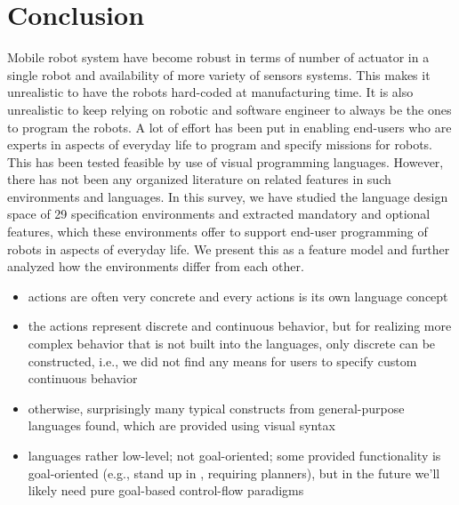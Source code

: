 \section{Conclusion}
Mobile robot system have become robust in terms of number of actuator in a single robot and  availability of more variety of sensors systems. This makes it unrealistic to have the robots hard-coded at manufacturing time. It is also unrealistic to keep relying on robotic and software engineer to always be the ones to program the robots. A lot of effort has been put in enabling end-users who are experts in aspects of everyday life to program and specify missions for robots. This has been tested feasible by use of visual programming languages. However, there has not been any organized literature on related features in such environments and languages. In this survey, we have studied the language design space of 29 specification environments and extracted mandatory and optional features, which these environments offer to support end-user programming of robots in aspects of everyday life. We present this as a feature model and further analyzed how the environments differ from each other.   


\begin{itemize}
	\item actions are often very concrete and every actions is its own language concept
	\item the actions represent discrete and continuous behavior, but for realizing more complex behavior that is not built into the languages, only discrete can be constructed, i.e., we did not find any means for users to specify custom continuous behavior
	\item otherwise, surprisingly many typical constructs from general-purpose languages found, which are provided using visual syntax
	\item languages rather low-level; not goal-oriented; some provided functionality is goal-oriented (e.g., stand up in \choregraphe, requiring planners), but in the future we'll likely need pure goal-based control-flow paradigms 
\end{itemize}